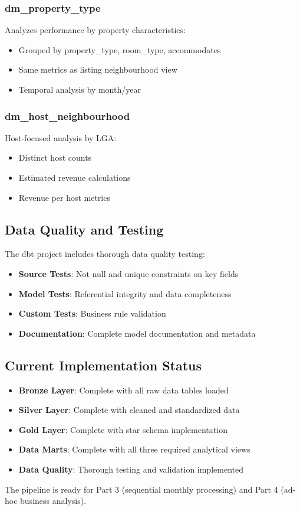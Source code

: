 \subsubsection{dm\_property\_type}
Analyzes performance by property characteristics:
\begin{itemize}
  \item Grouped by property\_type, room\_type, accommodates
  \item Same metrics as listing neighbourhood view
  \item Temporal analysis by month/year
\end{itemize}

\subsubsection{dm\_host\_neighbourhood}
Host-focused analysis by LGA:
\begin{itemize}
  \item Distinct host counts
  \item Estimated revenue calculations
  \item Revenue per host metrics
\end{itemize}

\subsection{Data Quality and Testing}
The dbt project includes thorough data quality testing:

\begin{itemize}
  \item \textbf{Source Tests}: Not null and unique constraints on key fields
  \item \textbf{Model Tests}: Referential integrity and data completeness
  \item \textbf{Custom Tests}: Business rule validation
  \item \textbf{Documentation}: Complete model documentation and metadata
\end{itemize}

\subsection{Current Implementation Status}
\begin{itemize}
  \item \textbf{Bronze Layer}: Complete with all raw data tables loaded
  \item \textbf{Silver Layer}: Complete with cleaned and standardized data
  \item \textbf{Gold Layer}: Complete with star schema implementation
  \item \textbf{Data Marts}: Complete with all three required analytical views
  \item \textbf{Data Quality}: Thorough testing and validation implemented
\end{itemize}

The pipeline is ready for Part 3 (sequential monthly processing) and Part 4 (ad-hoc business analysis).